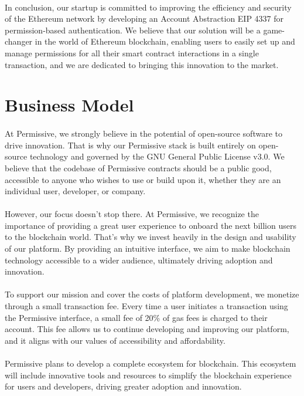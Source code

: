 \documentclass{article}
\begin{document}
\paragraph{}
In conclusion, our startup is committed to improving the efficiency and security of the Ethereum network by developing an Account Abstraction EIP 4337 for permission-based authentication. We believe that our solution will be a game-changer in the world of Ethereum blockchain, enabling users to easily set up and manage permissions for all their smart contract interactions in a single transaction, and we are dedicated to bringing this innovation to the market.
\section{Business Model}
\paragraph{}
At Permissive, we strongly believe in the potential of open-source software to drive innovation. That is why our Permissive stack is built entirely on open-source technology and governed by the GNU General Public License v3.0. We believe that the codebase of Permissive contracts should be a public good, accessible to anyone who wishes to use or build upon it, whether they are an individual user, developer, or company.
\paragraph{}
However, our focus doesn't stop there. At Permissive, we recognize the importance of providing a great user experience to onboard the next billion users to the blockchain world. That's why we invest heavily in the design and usability of our platform. By providing an intuitive interface, we aim to make blockchain technology accessible to a wider audience, ultimately driving adoption and innovation.
\paragraph{}
To support our mission and cover the costs of platform development, we monetize through a small transaction fee. Every time a user initiates a transaction using the Permissive interface, a small fee of 20\% of gas fees is charged to their account. This fee allows us to continue developing and improving our platform, and it aligns with our values of accessibility and affordability.
\paragraph{}
Permissive plans to develop a complete ecosystem for blockchain. This ecosystem will include innovative tools and resources to simplify the blockchain experience for users and developers, driving greater adoption and innovation.
\end{document}
